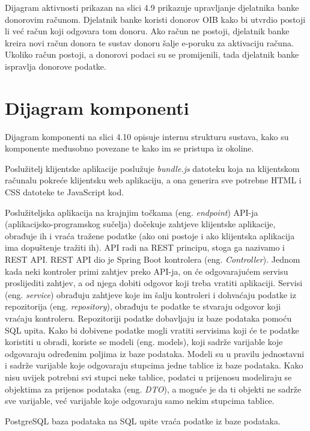     \par {Dijagram aktivnosti prikazan na slici 4.9 prikazuje upravljanje djelatnika banke donorovim računom. Djelatnik banke koristi donorov OIB kako bi utvrdio postoji li već račun koji odgovara tom donoru. Ako račun ne postoji, djelatnik banke kreira novi račun donora te sustav donoru šalje e-poruku za aktivaciju računa. Ukoliko račun postoji, a donorovi podaci su se promijenili, tada djelatnik banke ispravlja donorove podatke.}
			
			
			
		\eject
		\section{Dijagram komponenti}
		
		\par{
		    Dijagram komponenti na slici 4.10 opisuje internu strukturu sustava, kako su komponente međusobno povezane te kako im se pristupa iz okoline.
		}
		\par{
		    Poslužitelj klijentske aplikacije poslužuje \textit{bundle.js} datoteku koja na klijentskom računalu pokreće klijentsku web aplikaciju, a ona generira sve potrebne HTML i CSS datoteke te JavaScript kod. 
		}
		\par{
		    Poslužiteljska aplikacija na krajnjim točkama (eng. \textit{endpoint}) API-ja (aplikacijsko-programskog sučelja) dočekuje zahtjeve klijentske aplikacije, obrađuje ih i vraća tražene podatke (ako oni postoje i ako klijentska aplikacija ima dopuštenje tražiti ih). API radi na REST principu, stoga ga nazivamo i REST API. REST API dio je Spring Boot kontrolera (eng. \textit{Controller}). Jednom kada neki kontroler primi zahtjev preko API-ja, on će odgovarajućem servisu proslijediti zahtjev, a od njega dobiti odgovor koji treba vratiti aplikaciji. Servisi (eng. \textit{service}) obrađuju zahtjeve koje im šalju kontroleri i dohvaćaju podatke iz repozitorija (eng. \textit{repository}), obrađuju te podatke te stvaraju odgovor koji vraćaju kontroleru. Repozitoriji podatke dobavljaju iz baze podataka pomoću SQL upita. Kako bi dobivene podatke mogli vratiti servisima koji će te podatke koristiti u obradi, koriste se modeli (eng. models), koji sadrže varijable koje odgovaraju određenim poljima iz baze podataka. Modeli su u pravilu jednostavni i sadrže varijable koje odgovaraju stupcima jedne tablice iz baze podataka. Kako nisu uvijek potrebni svi stupci neke tablice, podatci u prijenosu modeliraju se objektima za prijenos podataka (eng. \textit{DTO}), a moguće je da ti objekti ne sadrže sve varijable, već varijable koje odgovaraju samo nekim stupcima tablice.
		}
		\par{
		    PostgreSQL baza podataka na SQL upite vraća podatke iz baze podataka.
		}
		

